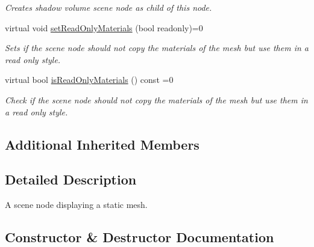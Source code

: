 \begin{DoxyCompactItemize}
\begin{DoxyCompactList}\small\item\em Creates shadow volume scene node as child of this node. \end{DoxyCompactList}\item 
virtual void \hyperlink{classirr_1_1scene_1_1IMeshSceneNode_a3bae73b4f7b1a6b265a62ece964c008f}{set\+Read\+Only\+Materials} (bool readonly)=0
\begin{DoxyCompactList}\small\item\em Sets if the scene node should not copy the materials of the mesh but use them in a read only style. \end{DoxyCompactList}\item 
virtual bool \hyperlink{classirr_1_1scene_1_1IMeshSceneNode_a1d7de4331b84480598f636c929418e3d}{is\+Read\+Only\+Materials} () const =0
\begin{DoxyCompactList}\small\item\em Check if the scene node should not copy the materials of the mesh but use them in a read only style. \end{DoxyCompactList}\end{DoxyCompactItemize}
\subsection*{Additional Inherited Members}


\subsection{Detailed Description}
A scene node displaying a static mesh. 

\subsection{Constructor \& Destructor Documentation}
\mbox{\label{classirr_1_1scene_1_1IMeshSceneNode_a491d6cac4ec270ab01c24e27c88e6ca4}} 
